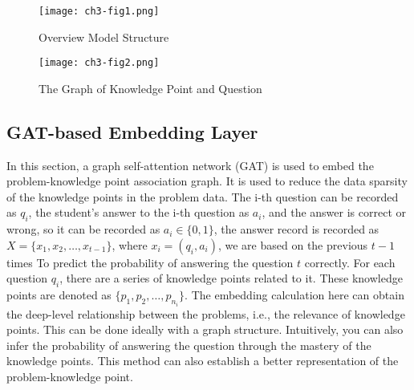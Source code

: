 \begin{figure}[h]
	\centering
	\texttt{[image: ch3-fig1.png]}
	\caption{Overview Model Structure}\label{fig:ch3-fig1}
\end{figure}
\begin{figure}[h]
	\centering
	\texttt{[image: ch3-fig2.png]}
	\caption{The Graph of Knowledge Point and Question}\label{fig:ch3-fig2}
\end{figure}


\subsection{GAT-based Embedding Layer}

In this section, a graph self-attention network (GAT) is used to embed the problem-knowledge point association graph. It is used to reduce the data sparsity of the knowledge points in the problem data. The i-th question can be recorded as \(q_i\), the student's answer to the i-th question as \(a_i\), and the answer is correct or wrong, so it can be recorded as \(a_i\in \{0,1\} \), the answer record is recorded as \(X=\{x_1,x_2,\ldots,x_{t-1}\} \), where \(x_i=(q_i,a_i)\), we are based on the previous \(t-1\) times To predict the probability of answering the question \(t\) correctly. For each question \(q_i\), there are a series of knowledge points related to it. These knowledge points are denoted as \( \{p_1,p_2,\ldots,p_{n_i}\} \). The embedding calculation here can obtain the deep-level relationship between the problems, i.e., the relevance of knowledge points. This can be done ideally with a graph structure. Intuitively, you can also infer the probability of answering the question through the mastery of the knowledge points. This method can also establish a better representation of the problem-knowledge point.

